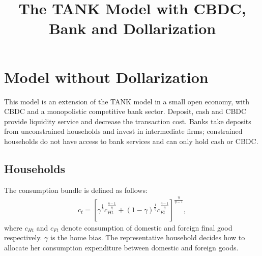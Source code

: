 \documentclass[12pt]{article}
\begin{document}
\title{\large \textbf{The TANK Model with CBDC, Bank and Dollarization}}
\date{}
\maketitle
\section{Model without Dollarization}
This model is an extension of the TANK model in a small open economy, with CBDC and a monopolistic competitive bank sector. Deposit, cash and CBDC provide liquidity service and decrease the transaction cost. Banks take deposits from unconstrained households and invest in intermediate firms; constrained households do not have access to bank services and can only hold cash or CBDC. 

\subsection{Households}
The consumption bundle is defined as follows:
\begin{align*}
c_t = [\gamma^{\frac{1}{\eta}}c_{Ht}^{\frac{\eta-1}{\eta}}+(1-\gamma)^{\frac{1}{\eta}}c_{Ft}^{\frac{\eta-1}{\eta}}]^{\frac{\eta}{\eta-1}}, 
\end{align*}
where $c_{Ht}$ and $c_{Ft}$ denote consumption of domestic and foreign final good respectively. $\gamma$ is the home bias. The representative household decides how to allocate her consumption expenditure between domestic and foreign goods.
\end{document}

